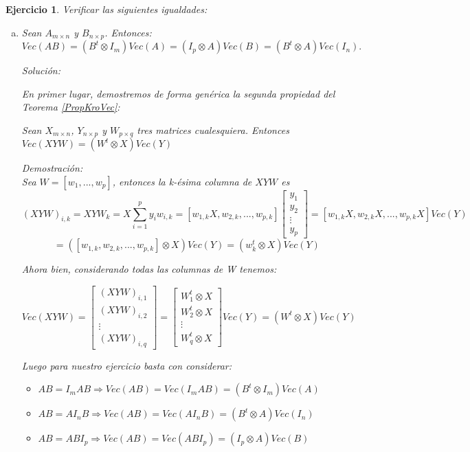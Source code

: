 \documentclass{article}
\theoremstyle{theorem-style}  %
\theoremstyle{definition-style}
\theoremstyle{example-style}
\theoremstyle{exercise-style}
\newtheorem{exercise}{Ejercicio}[section]
\begin{document}
	\begin{exercise}
		Verificar las siguientes igualdades:
		\begin{enumerate}[a)]
			\item Sean $A_{m \times n}$ y $B_{n \times p}$. Entonces:
			$$Vec(AB) = (B^t \otimes I_m)Vec(A) = (I_p \otimes A)Vec(B) = (B^t \otimes A)Vec(I_n).$$
			
			\textit{Solución:}
			
			En primer lugar, demostremos de forma genérica la segunda propiedad del Teorema \ref{PropKroVec}:
			
			\textit{Sean $X_{m \times n}$, $Y_{n \times p}$ y $W_{p \times q}$ tres matrices cualesquiera. Entonces $Vec(XYW) = (W^t \otimes X)Vec(Y)$}
			
			\textit{Demostración:}
			\\Sea $W=[w_1,...,w_p]$, entonces la k-ésima columna de $XYW$ es $$(XYW)_{i,k}=XYW_k=X\sum_{i=1}^{p}y_iw_{i,k}=[w_{1,k}X,w_{2,k},...,w_{p,k}] \left[{\begin{array}{c} y_1\\ y_2\\ \vdots \\ y_p \end{array} } \right] = [w_{1,k}X, w_{2,k}X,...,w_{p,k}X]Vec(Y)$$
			$$= ([w_{1,k}, w_{2,k},...,w_{p,k}]\otimes X)Vec(Y) = (w_k^t \otimes X)Vec(Y)$$
			
			Ahora bien, considerando todas las columnas de W tenemos:
			
			$$Vec(XYW)= \left[\begin{array}{c} (XYW)_{i,1}\\ (XYW)_{i,2}\\ \vdots \\ (XYW)_{i,q} \end{array}  \right]=
			\left[\begin{array}{c} W_1^t\otimes X\\ W_2^t\otimes X\\ \vdots \\ W_q^t\otimes X \end{array}  \right]Vec(Y) = (W^t \otimes X)Vec(Y)$$
			
			Luego para nuestro ejercicio basta con considerar:
			\begin{itemize}
				\item $AB = I_mAB \Rightarrow Vec(AB)=Vec(I_mAB)=(B^t\otimes I_m)Vec(A)$
				\item $AB = AI_nB \Rightarrow Vec(AB)=Vec(AI_nB)=(B^t\otimes A)Vec(I_n)$
				\item $AB = ABI_p \Rightarrow Vec(AB)=Vec(ABI_p)=(I_p\otimes A)Vec(B)$
			\end{itemize}
			

\end{enumerate}
\end{exercise}
\end{document}
